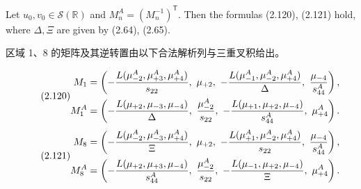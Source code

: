 \begin{paperlemmaen}
Let $u_0,v_0\in\mathcal S(\mathbb R)$ and $M_n^A=(M_n^{-1})^{\mathsf T}$. Then the formulas (2.120), (2.121) hold, where $\Delta,\Xi$ are given by (2.64), (2.65).
\end{paperlemmaen}
\begin{paperlemmacn*}
区域 1、8 的矩阵及其逆转置由以下合法解析列与三重叉积给出。
\end{paperlemmacn*}
\begin{equation}\originaleq{2.120}
\begin{aligned}
M_1&=\left(-\dfrac{L(\mu_{-2}^A,\mu_{+3}^A,\mu_{+4}^A)}{s_{22}},\ \mu_{+2},\ -\dfrac{L(\mu_{-1}^A,\mu_{-2}^A,\mu_{+4}^A)}{\Delta},\ \dfrac{\mu_{-4}}{s_{44}^A}\right),\\
M_1^A&=\left(-\dfrac{L(\mu_{+2},\mu_{-3},\mu_{-4})}{\Delta},\ \dfrac{\mu_{-2}^A}{s_{22}},\ -\dfrac{L(\mu_{+1},\mu_{+2},\mu_{-4})}{s_{44}^A},\ \mu_{+4}^A\right).
\end{aligned}
\end{equation}
\begin{equation}\originaleq{2.121}
\begin{aligned}
M_8&=\left(-\dfrac{L(\mu_{-2}^A,\mu_{-3}^A,\mu_{+4}^A)}{\Xi},\ \mu_{+2},\ -\dfrac{L(\mu_{+1}^A,\mu_{-2}^A,\mu_{+4}^A)}{s_{22}},\ \dfrac{\mu_{-4}}{s_{44}^A}\right),\\
M_8^A&=\left(-\dfrac{L(\mu_{+2},\mu_{+3},\mu_{-4})}{s_{44}^A},\ \dfrac{\mu_{-2}^A}{s_{22}},\ -\dfrac{L(\mu_{-1},\mu_{+2},\mu_{-4})}{\Xi},\ \mu_{+4}^A\right).
\end{aligned}
\end{equation}

